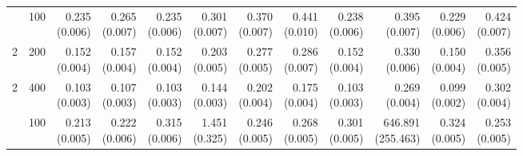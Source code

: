 \begin{table}[p]
{\begin{tabular}{llrrrrrrrrrr}
\addlinespace
2 & 100 & \shortstack{0.235\\(0.006)} & \shortstack{0.265\\(0.007)} & \shortstack{0.235\\(0.006)} & \shortstack{0.301\\(0.007)} & \shortstack{0.370\\(0.007)} & \shortstack{0.441\\(0.010)} & \shortstack{0.238\\(0.006)} & \shortstack{0.395\\(0.007)} & \shortstack{0.229\\(0.006)} & \shortstack{0.424\\(0.007)} \\
2 & 200 & \shortstack{0.152\\(0.004)} & \shortstack{0.157\\(0.004)} & \shortstack{0.152\\(0.004)} & \shortstack{0.203\\(0.005)} & \shortstack{0.277\\(0.005)} & \shortstack{0.286\\(0.007)} & \shortstack{0.152\\(0.004)} & \shortstack{0.330\\(0.006)} & \shortstack{0.150\\(0.004)} & \shortstack{0.356\\(0.005)} \\
2 & 400 & \shortstack{0.103\\(0.003)} & \shortstack{0.107\\(0.003)} & \shortstack{0.103\\(0.003)} & \shortstack{0.144\\(0.003)} & \shortstack{0.202\\(0.004)} & \shortstack{0.175\\(0.004)} & \shortstack{0.103\\(0.003)} & \shortstack{0.269\\(0.004)} & \shortstack{0.099\\(0.002)} & \shortstack{0.302\\(0.004)} \\
\addlinespace
3 & 100 & \shortstack{0.213\\(0.005)} & \shortstack{0.222\\(0.006)} & \shortstack{0.315\\(0.006)} & \shortstack{1.451\\(0.325)} & \shortstack{0.246\\(0.005)} & \shortstack{0.268\\(0.005)} & \shortstack{0.301\\(0.005)} & \shortstack{646.891\\(255.463)} & \shortstack{0.324\\(0.005)} & \shortstack{0.253\\(0.005)} \\

\end{tabular}}
\end{table}
